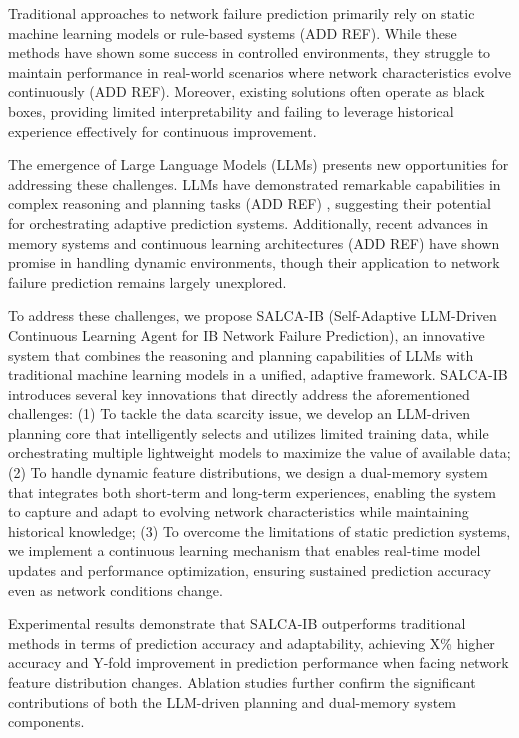 \documentclass[conference]{IEEEtran}
\begin{document}
Traditional approaches to network failure prediction primarily rely on static machine learning models or rule-based systems (ADD REF). While these methods have shown some success in controlled environments, they struggle to maintain performance in real-world scenarios where network characteristics evolve continuously (ADD REF). Moreover, existing solutions often operate as black boxes, providing limited interpretability and failing to leverage historical experience effectively for continuous improvement.
 
The emergence of Large Language Models (LLMs) presents new opportunities for addressing these challenges. LLMs have demonstrated remarkable capabilities in complex reasoning and planning tasks (ADD REF) , suggesting their potential for orchestrating adaptive prediction systems. Additionally, recent advances in memory systems and continuous learning architectures (ADD REF) have shown promise in handling dynamic environments, though their application to network failure prediction remains largely unexplored.

To address these challenges, we propose SALCA-IB (Self-Adaptive LLM-Driven Continuous Learning Agent for IB Network Failure Prediction), an innovative system that combines the reasoning and planning capabilities of LLMs with traditional machine learning models in a unified, adaptive framework. SALCA-IB introduces several key innovations that directly address the aforementioned challenges: 
(1) To tackle the data scarcity issue, we develop an LLM-driven planning core that intelligently selects and utilizes limited training data, while orchestrating multiple lightweight models to maximize the value of available data;
(2) To handle dynamic feature distributions, we design a dual-memory system that integrates both short-term and long-term experiences, enabling the system to capture and adapt to evolving network characteristics while maintaining historical knowledge;
(3) To overcome the limitations of static prediction systems, we implement a continuous learning mechanism that enables real-time model updates and performance optimization, ensuring sustained prediction accuracy even as network conditions change.

Experimental results demonstrate that SALCA-IB outperforms traditional methods in terms of prediction accuracy and adaptability, achieving X\% higher accuracy and Y-fold improvement in prediction performance when facing network feature distribution changes. Ablation studies further confirm the significant contributions of both the LLM-driven planning and dual-memory system components.
\end{document}
